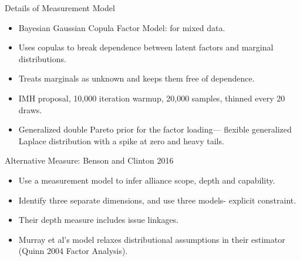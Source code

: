 \documentclass[12pt]{beamer}
\begin{document}

\begin{frame}{Details of Measurement Model}

\begin{itemize}
\item Bayesian Gaussian Copula Factor Model: for mixed data. 
\item Uses copulas to break dependence between latent factors and marginal distributions. 
\item Treats marginals as unknown and keeps them free of dependence. 
\item IMH proposal, 10,000 iteration warmup, 20,000 samples, thinned every 20 draws. 
\item Generalized double Pareto prior for the factor loading--- flexible generalized Laplace distribution with a spike at zero and heavy tails. 
\end{itemize} 


\end{frame}




\begin{frame}{Alternative Measure: Benson and Clinton 2016}

\begin{itemize}
\item Use a measurement model to infer alliance scope, depth and capability. 
\item Identify three separate dimensions, and use three models- explicit constraint. 
\item Their depth measure includes issue linkages.  
\item Murray et al's model relaxes distributional assumptions in their estimator (Quinn 2004 Factor Analysis). 
\end{itemize}


\end{frame}

\end{document}

